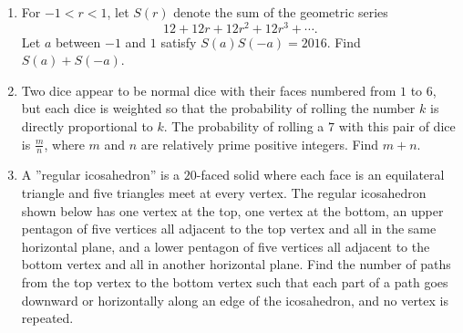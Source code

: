 \documentclass{article}
\begin{document}
\begin{enumerate}[label=\arabic*., itemsep=0.5em]\item For \(-1<r<1\), let \(S(r)\) denote the sum of the geometric series 
\begin{equation*}
12+12r+12r^2+12r^3+\cdots .
\end{equation*}
  Let \(a\) between \(-1\) and \(1\) satisfy \(S(a)S(-a)=2016\). Find \(S(a)+S(-a)\).\par \vspace{0.5em}\item Two dice appear to be normal dice with their faces numbered from \(1\) to \(6\), but each dice is weighted so that the probability of rolling the number \(k\) is directly proportional to \(k\). The probability of rolling a \(7\) with this pair of dice is \(\frac{m}{n}\), where \(m\) and \(n\) are relatively prime positive integers. Find \(m+n\).\par \vspace{0.5em}\item A ''regular icosahedron'' is a \(20\)-faced solid where each face is an equilateral triangle and five triangles meet at every vertex. The regular icosahedron shown below has one vertex at the top, one vertex at the bottom, an upper pentagon of five vertices all adjacent to the top vertex and all in the same horizontal plane, and a lower pentagon of five vertices all adjacent to the bottom vertex and all in another horizontal plane. Find the number of paths from the top vertex to the bottom vertex such that each part of a path goes downward or horizontally along an edge of the icosahedron, and no vertex is repeated.


\end{enumerate}
\end{document}
